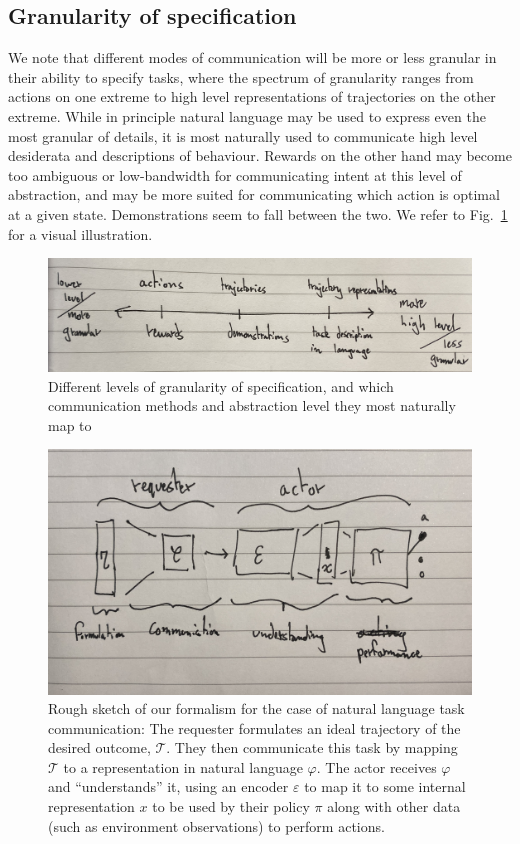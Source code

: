 \documentclass{article}
\begin{document}
\subsection{Granularity of specification}

We note that different modes of communication will be more or less granular in their ability to
specify tasks, where the spectrum of granularity ranges from actions on one extreme to high level
representations of trajectories on the other extreme. While in principle natural language may be
used to express even the most granular of details, it is most naturally used to communicate high
level desiderata and descriptions of behaviour. Rewards on the other hand may become too ambiguous
or low-bandwidth for communicating intent at this level of abstraction, and may be more suited for
communicating which action is optimal at a given state. Demonstrations seem to fall between the two. We refer to
Fig.~\ref{fig:granularity} for a visual illustration.

\begin{figure}[ht]
	\centering
	\includegraphics[width=\textwidth]{img/IMG_9800.jpg}
	\caption{Different levels of granularity of specification, and which communication methods and
		abstraction level they most naturally map to}
	\label{fig:granularity}
\end{figure}

\begin{figure}[ht]
	\centering
	\includegraphics[width=\textwidth]{img/IMG_9745.jpg}
	\caption{Rough sketch of our formalism for the case of natural language task communication: The
		requester formulates an ideal trajectory of the desired outcome, $\mathcal{T}$. They then
		communicate this task by  mapping $\mathcal{T}$ to a representation in natural language $\varphi$.
		The actor receives $\varphi$ and ``understands'' it, using an encoder $\varepsilon$ to map it to
		some internal representation $x$ to be used by their policy $\pi$ along with other data (such as
		environment observations) to perform actions.}
	\label{fig:rough_sketch}
\end{figure}
\end{document}
